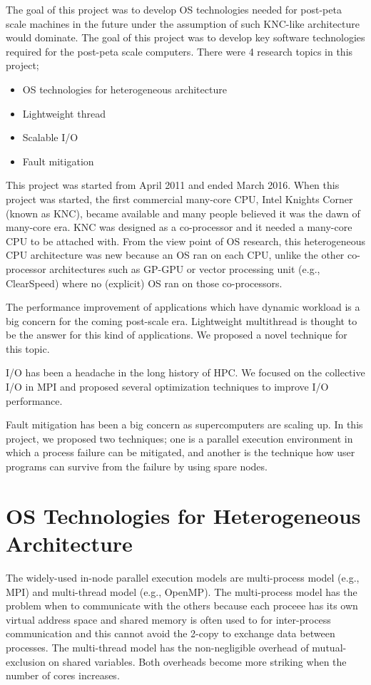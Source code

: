 The goal of this project was to develop OS technologies needed for
post-peta scale machines in the future under the assumption of such
KNC-like architecture would dominate. The goal of this project was to
develop key software technologies required for the post-peta scale
computers. There were 4 research topics in this project;

\begin{itemize}
\item OS technologies for heterogeneous architecture
\item Lightweight thread
\item Scalable I/O
\item Fault mitigation
\end{itemize}

This project was started from April 2011 and ended March 2016. When
this project was started, the first commercial many-core CPU, Intel
Knights Corner (known as KNC)\cite{overview-xeon-phi}, became
available and many people 
believed it was the dawn of many-core era. KNC was designed as a
co-processor and it needed a many-core CPU to be attached with. From
the view point of OS research, this heterogeneous CPU architecture was
new because an OS ran on each CPU, unlike the other co-processor
architectures such as GP-GPU or vector processing unit (e.g.,
ClearSpeed) where no (explicit) OS ran on those co-processors. 

The performance improvement of applications which have dynamic
workload is a big concern for the coming post-scale era. Lightweight
multithread is thought to be the answer for this kind of
applications. We proposed a novel technique for this topic.

I/O has been a headache in the long history of HPC. We focused on the
collective I/O in MPI and proposed several optimization techniques to
improve I/O performance.

Fault mitigation has been a big concern as supercomputers are scaling
up. In this project, we proposed two techniques; one is a parallel
execution environment in which a process failure can be mitigated, and
another is the technique how user programs can survive from the
failure by using spare nodes.

\section{OS Technologies for Heterogeneous Architecture}

The widely-used in-node parallel execution models are
multi-process model (e.g., MPI) and multi-thread model (e.g.,
OpenMP). The multi-process model has the problem when to communicate
with the others because each proceee has its own virtual address space
and shared memory is often used to for inter-process
communication and this cannot avoid the 2-copy to exchange data
between processes. The multi-thread model has the non-negligible  
overhead of mutual-exclusion on shared variables. Both overheads
become more striking when the number of cores increases. 


